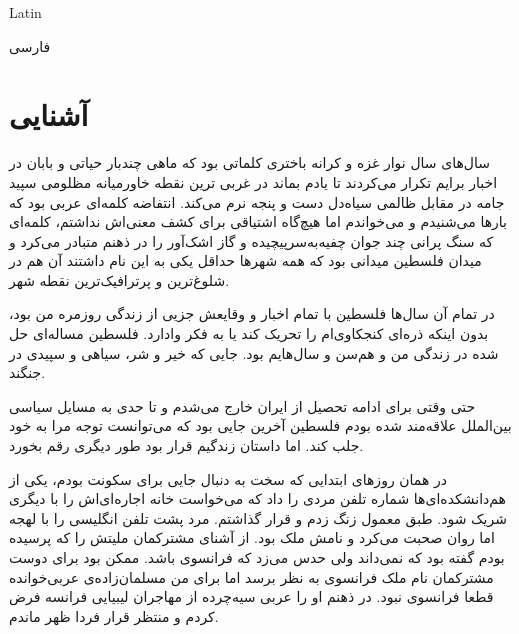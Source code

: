 \documentclass[letterpaper,12pt,oneside]{article}  %
\title{\ptitle}
\author{\pauthor}
\date{\today}
\begin{document}
\maketitle
\begin{latin}
Latin
\end{latin}
\begin{persian}
فارسی
\end{persian}
\section{آشنایی}
سا‌ل‌های سال نوار غزه و کرانه باختری  کلماتی بود که ماهی چندبار حیاتی و بابان در اخبار برایم تکرار می‌کردند تا یادم بماند در غربی ترین نقطه خاورمیانه مظلومی سپید جامه در مقابل ظالمی سیاه‌دل دست و پنجه نرم‌ می‌کند. انتفاضه کلمه‌ای عربی بود که بارها می‌شنیدم و می‌خواندم اما هیچ‌گاه اشتیاقی برای کشف معنی‌اش نداشتم، کلمه‌ای که سنگ پرانی چند جوان چفیه‌به‌سرپیچیده و گاز اشک‌آور را در ذهنم متبادر می‌کرد و میدان فلسطین میدانی بود که همه شهر‌ها حداقل یکی به این نام داشتند آن هم در شلوغ‌ترین و پرترافیک‌ترین نقطه شهر.

در تمام آن سال‌ها فلسطین با تمام اخبار و وقایعش جزیی از زندگی روزمره من بود، بدون اینکه ذره‌ای کنجکاوی‌ام را تحریک کند یا به فکر وادارد. فلسطین مساله‌ای حل شده در زندگی من و هم‌سن و سال‌هایم بود. جایی که خیر و شر، سیاهی و سپیدی در جنگند.

حتی وقتی برای ادامه تحصیل از ایران خارج‌ می‌شدم و تا حدی به مسایل سیاسی بین‌الملل علاقه‌مند شده بودم فلسطین آخرین جایی بود که می‌توانست توجه مرا به خود جلب کند. اما داستان زندگیم قرار بود طور دیگری رقم بخورد.

در همان روزهای ابتدایی که سخت به دنبال جایی برای سکونت بودم، یکی از هم‌دانشکده‌ای‌ها شماره تلفن مردی را داد که می‌خواست خانه اجاره‌ای‌اش را با دیگری شریک شود. طبق معمول زنگ زدم و قرار گذاشتم. مرد پشت تلفن انگلیسی را با لهجه اما روان صحبت می‌کرد و نامش ملک بود. از آشنای مشترکمان ملیتش را که پرسیده بودم گفته بود که نمی‌داند ولی حدس می‌زد که فرانسوی باشد. ممکن بود برای دوست مشترکمان نام ملک فرانسوی به نظر برسد اما برای من مسلمان‌زاده‌ی عربی‌خوانده قطعا فرانسوی نبود. در ذهنم او را عربی سیه‌چرده از مهاجران لیبیایی فرانسه فرض کردم و منتظر قرار فردا ظهر ماندم.
\end{document}

